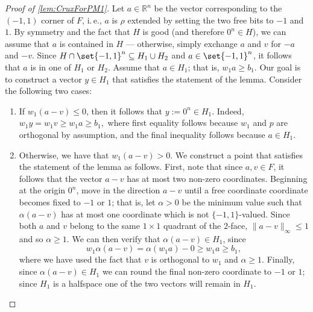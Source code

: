 \documentclass[11pt]{article}
\newcommand{\ie}{i.\,e.}
\begin{document}
\begin{proof}[Proof of \autoref{lem:CruxForPM1}]
	Let $a \in \mathbb{R}^n$ be the vector corresponding to the $(-1,1)$ corner of $F$, \ie,  $a$ is $\rho$ extended by setting the two free bits to $-1$ and $1$. By symmetry and the fact that $H$ is good (and therefore $0^n \in H$), we can assume that $a$ is contained in $H$ --- otherwise, simply exchange $a$ and $v$ for $-a$ and $-v$.
	Since $H \cap \set{-1, 1}^n \subseteq H_1 \cup H_2$ and $a \in \set{-1,1}^n$, it follows that $a$ is in one of $H_1$ or $H_2$.  
	Assume that $a \in H_1$; that is, $w_1a \geq b_1$.
	Our goal is to construct a vector $y \in H_1$ that satisfies the statement of the lemma. Consider the following two cases:
	\begin{enumerate}
		\item[(i)] If $w_1( a-v) \leq 0$, then it follows that  $y := 0^n \in H_1$. Indeed,
	$w_1 y = w_1v \geq w_1 a \geq b_1,$
	where first equality follows because $w_1$ and $p$ are orthogonal by assumption, and the final inequality follows because $a \in H_1$. 
		\item[(ii)] Otherwise, we have that $w_1(a-v) > 0$. 
			We construct a point that satisfies the statement of the lemma as follows.
			First, note that since $a, v \in F$, it follows that the vector $a - v$ has at most two non-zero coordinates.
			Beginning at the origin $0^n$, move in the direction $a-v$ until a free coordinate coordinate becomes fixed to $-1$ or $1$; that is, let $\alpha>0$ be the minimum value such that $\alpha(a-v)$ has at most one coordinate which is not $\{-1,1\}$-valued.
			Since both $a$ and $v$ belong to the same $1 \times 1$ quadrant of the $2$-face, $\|a-v\|_{\infty} \leq 1$ and so $\alpha \geq 1$.
			We can then verify that $\alpha(a-v) \in H_1$, since
			\[w_1 \alpha(a-v) = \alpha(w_1a) - 0 \geq w_1a \geq b_1,\]
			where we have used the fact that $v$ is orthogonal to $w_1$ and $\alpha \geq 1$.	
			Finally, since $\alpha(a - v) \in H_1$ we can round the final non-zero coordinate to $-1$ or $1$; since $H_1$ is a halfspace one of the two vectors will remain in $H_1$.    \qedhere  %
	\end{enumerate}
%
\end{proof}
\end{document}
